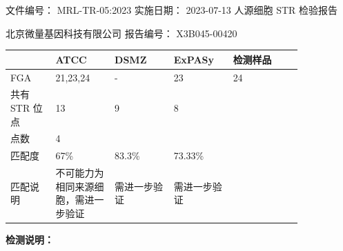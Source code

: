 \documentclass[UTF8,10pt,a4paper,fontset=fandol]{ctexart}
\newcommand{\fieldvalue}[1]{#1}
\begin{document}
\newpage

\noindent
文件编号：%
\fieldvalue{MRL-TR-05:2023}
\hfill
实施日期：%
\fieldvalue{2023-07-13}
\hfill
人源细胞 STR 检验报告

\noindent
北京微量基因科技有限公司
\hfill
报告编号：%
\fieldvalue{X3B045-00420}

\medskip

\noindent
\begin{tabular}{|p{0.13\linewidth}|p{0.17\linewidth}|p{0.17\linewidth}|p{0.17\linewidth}|p{0.20\linewidth}|}
\hline
 & ATCC & DSMZ & ExPASy & 检测样品 \\
\hline
FGA &
\fieldvalue{21,23,24} &
\fieldvalue{-} &
\fieldvalue{23} &
\fieldvalue{24} \\
\hline
共有 STR 位点 &
\fieldvalue{13} &
\fieldvalue{9} &
\fieldvalue{8} &
\\
\hline
点数 &
\fieldvalue{4} &
 & & \\
\hline
匹配度 &
\fieldvalue{67\%} &
\fieldvalue{83.3\%} &
\fieldvalue{73.33\%} &
\\
\hline
匹配说明 &
\fieldvalue{不可能力为相同来源细胞，需进一步验证} &
\fieldvalue{需进一步验证} &
\fieldvalue{需进一步验证} &
\\
\hline
\end{tabular}

\bigskip

\noindent\textbf{检测说明：}
\end{document}
